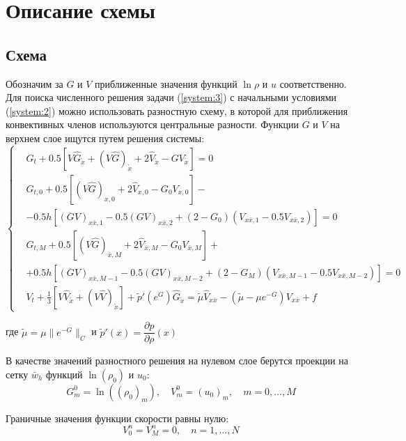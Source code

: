 \section{Описание схемы}

\subsection{Схема}
Обозначим за $G$ и $V$ приближенные значения функций $\ln \rho$ и $u$ соответственно.
Для поиска численного решения задачи (\ref{system:3}) с начальными условиями (\ref{system:2}) можно использовать разностную схему, в которой для приближения конвективных членов используются центральные разности.
Функции $G$ и $V$ на верхнем слое ищутся путем решения системы:
\begin{equation}
\label{system:4}
\left\{
 \begin{aligned}
  & 
    G_t + 0.5 [
      V \hat G_{\mathring{x}} + (V \hat G)_{\mathring{x}} +
      2 \hat V_{\mathring{x}} - G V_{\mathring{x}} ] = 0 
  \\
  & 
    G_{t,0} + 0.5 [
      (V \hat G)_{x,0} + 2 \hat V_{x,0} - G_0 V_{x,0}] - \\
  & - 0.5h [
      (GV)_{x \bar x, 1} - 0.5(GV)_{x \bar x, 2} +
      (2 - G_0) (V_{x \bar x, 1} - 0.5V_{x \bar x, 2}) ] = 0
  \\
  & 
    G_{t,M} + 0.5 [
      (V \hat G)_{\bar x,M} + 2 \hat V_{\bar x,M} - G_0 V_{\bar x,M}] + \\
  & + 0.5h [
      (GV)_{x \bar x, M-1} - 0.5(GV)_{x \bar x, M-2} +
      (2 - G_M) (V_{x \bar x, M-1} - 0.5V_{x \bar x, M-2}) ] = 0
  \\
  & 
    V_t + \frac13 [V \hat V_{\mathring{x}} + (V \hat V)_{\mathring{x}} ] + 
    \tilde{p}'(e^G) \hat G_{\mathring{x}} =
    \tilde{\mu} \hat V_{x \bar x} - 
    (\tilde{\mu} - \mu e^{-G}) V_{x \bar x} + f
 \end{aligned}
\right.
\end{equation}

где $ \tilde{\mu} = \mu \lVert e^{-G} \rVert_C $ и 
$\tilde{p}'(x) = \dfrac{\partial p}{\partial \rho}(x)$

В качестве значений разностного решения на нулевом слое берутся проекции на
сетку $\bar w_h$ функций $\ln(\rho_0)$ и $u_0$:
$$
  G_{m}^{0} = \ln ((\rho_0)_m), \quad
  V_{m}^{0} = (u_0)_m, \quad
  m = 0,\dots,M
$$

Граничные значения функции скорости равны нулю:
$$
   V_{0}^{n} = V_{M}^{n} = 0, \quad
   n = 1,\dots,N
$$

